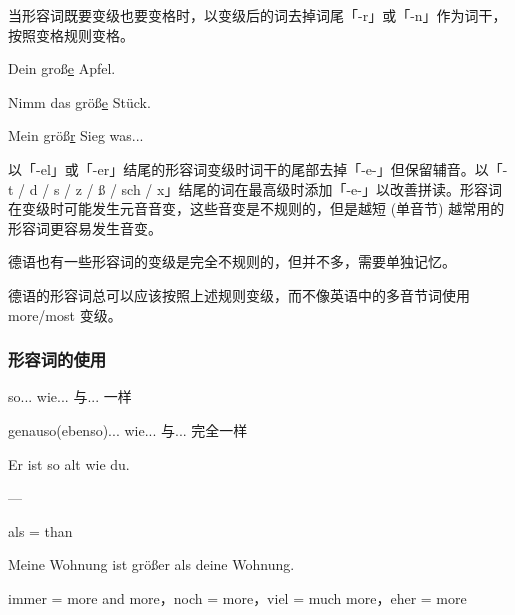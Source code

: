 当形容词既要变级也要变格时，以变级后的词去掉词尾「-r」或「-n」作为词干，按照变格规则变格。

Dein groß\uline{e} Apfel.

Nimm das größ\uline{e} Stück.

Mein größ\uline{r} Sieg was...

以「-el」或「-er」结尾的形容词变级时词干的尾部去掉「-e-」但保留辅音。以「-t / d / s / z / ß / sch / x」结尾的词在最高级时添加「-e-」以改善拼读。形容词在变级时可能发生元音音变，这些音变是不规则的，但是越短 (单音节) 越常用的形容词更容易发生音变。

德语也有一些形容词的变级是完全不规则的，但并不多，需要单独记忆。

德语的形容词总可以应该按照上述规则变级，而不像英语中的多音节词使用 more/most 变级。

\subsubsection{形容词的使用}

so... wie... 与... 一样

genauso(ebenso)... wie... 与... 完全一样

Er ist so alt wie du.

---

als = than

Meine Wohnung ist größer als deine Wohnung.

immer = more and more，noch = more，viel = much more，eher = more


